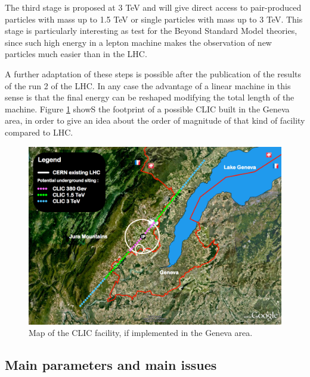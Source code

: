 The third stage is proposed at 3 TeV and will give direct access to pair-produced particles with mass up to 1.5 TeV or single particles with mass up to 3 TeV. This stage is particularly interesting as test for the Beyond Standard Model theories, since such high energy in a lepton machine makes the observation of new particles much easier than in the LHC.

A further adaptation of these steps is possible after the publication of the results of the run 2 of the LHC. In any case the advantage of a linear machine in this sense is that the final energy can be reshaped modifying the total length of the machine. Figure \ref{CLIC_map} showS the footprint of a possible CLIC built in the Geneva area, in order to give an idea about the order of magnitude of that kind of facility compared to LHC.

\begin{figure}[h]
\centering

\includegraphics[scale=0.3]{pictures/CLIC_map}
\caption{Map of the CLIC facility, if implemented in the Geneva area.}
\label{CLIC_map}

\end{figure}


\subsection{Main parameters and main issues}

